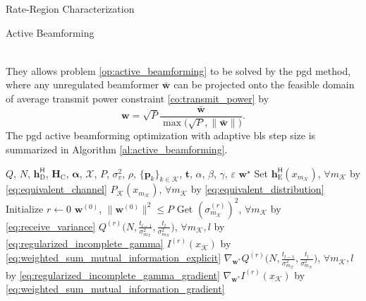 \documentclass[journal]{IEEEtran}
\begin{document}
\begin{section}{Rate-Region Characterization}
\begin{subsection}{Active Beamforming}
\begin{figure*}[!b]
\begin{align}
				\label{eq:weighted_sum_mutual_information_gradient}
			\end{align}
		\end{figure*}
		They allows problem \eqref{op:active_beamforming} to be solved by the \gls{pgd} method, where any unregulated beamformer $\bar{\boldsymbol{w}}$ can be projected onto the feasible domain of average transmit power constraint \eqref{co:transmit_power} by
		\begin{equation}
			\boldsymbol{w} = \sqrt{P} \frac{\bar{\boldsymbol{w}}}{\max\bigl(\sqrt{P},\lVert\bar{\boldsymbol{w}}\rVert\bigr)}.
			\label{eq:beamforming_projection}
		\end{equation}
		The \gls{pgd} active beamforming optimization with adaptive \gls{bls} step size \cite[Section 9.2]{Boyd2004} is summarized in Algorithm \ref{al:active_beamforming}.
		\begin{algorithm}[!t]
			\caption{Iterative Active Beamforming Optimization by \gls{pgd} with \gls{bls}}
			\label{al:active_beamforming}
			\begin{algorithmic}[1]
				\Require $Q$, $N$, $\boldsymbol{h}_{\text{D}}^\mathsf{H}$, $\boldsymbol{H}_{\text{C}}$, $\boldsymbol{\alpha}$, $\mathcal{X}$, $P$, $\sigma_v^2$, $\rho$, $\{\boldsymbol{p}_k\}_{k \in \mathcal{K}}$, $\boldsymbol{t}$, $\alpha$, $\beta$, $\gamma$, $\varepsilon$
				\Ensure $\boldsymbol{w}^\star$
				\State Set $\boldsymbol{h}_{\text{E}}^\mathsf{H}(x_{m_{\mathcal{K}}})$, $\forall m_{\mathcal{K}}$ by \eqref{eq:equivalent_channel}
				\State \phantom{Set} $P_{\mathcal{K}}(x_{m_{\mathcal{K}}})$, $\forall m_{\mathcal{K}}$ by \eqref{eq:equivalent_distribution}
				\State Initialize $r \gets 0$
				\State \phantom{Initialize} $\boldsymbol{w}^{(0)}$, $\lVert\boldsymbol{w}^{(0)}\rVert^2 \le P$
				\State Get $(\sigma_{m_{\mathcal{K}}}^{(r)})^2$, $\forall m_{\mathcal{K}}$ by \eqref{eq:receive_variance} \label{st:gradient_descent_begin}
				\State \phantom{Get} $Q^{(r)}\bigl(N,\frac{t_{l-1}}{\sigma_{m_{\mathcal{K}}}^2},\frac{t_l}{\sigma_{m_{\mathcal{K}}}^2}\bigr)$, $\forall m_{\mathcal{K}},l$ by \eqref{eq:regularized_incomplete_gamma}
				\State \phantom{Get} $I^{(r)}(x_{\mathcal{K}})$ by \eqref{eq:weighted_sum_mutual_information_explicit} \label{st:gradient_descent_end}
				\State \phantom{Get} $\nabla_{\boldsymbol{w}^*} Q^{(r)}\bigl(N,\frac{t_{l-1}}{\sigma_{m_{\mathcal{K}}}^2},\frac{t_l}{\sigma_{m_{\mathcal{K}}}^2}\bigr)$, $\forall m_{\mathcal{K}},l$ by \eqref{eq:regularized_incomplete_gamma_gradient} \label{st:gradient_update_start}
				\State \phantom{Get} $\nabla_{\boldsymbol{w}^*} I^{(r)}(x_{\mathcal{K}})$ by \eqref{eq:weighted_sum_mutual_information_gradient} \label{st:gradient_update_end}

\end{algorithmic}
\end{algorithm}
\end{subsection}
\end{section}
\end{document}
